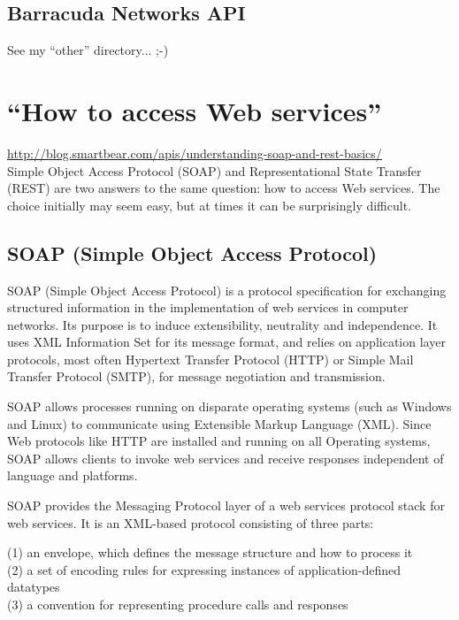 \documentclass[11pt]{article}
\begin{document}
\subsection{Barracuda Networks API}
See my ``other'' directory... ;-)



\newpage
\section{``How to access Web services''}
\href{http://blog.smartbear.com/apis/understanding-soap-and-rest-basics/}{http://blog.smartbear.com/apis/understanding-soap-and-rest-basics/}\\
Simple Object Access Protocol (SOAP) and Representational State Transfer (REST) are two answers to the same question: how to access Web services. The choice initially may seem easy, but at times it can be surprisingly difficult.

\subsection{SOAP (Simple Object Access Protocol)} 
SOAP (Simple Object Access Protocol) is a protocol specification for
exchanging structured information in the implementation of web
services in computer networks. Its purpose is to induce extensibility,
neutrality and independence. It uses XML Information Set for its
message format, and relies on application layer protocols, most often
Hypertext Transfer Protocol (HTTP) or Simple Mail Transfer Protocol
(SMTP), for message negotiation and transmission.

SOAP allows processes running on disparate operating systems (such as
Windows and Linux) to communicate using Extensible Markup Language
(XML). Since Web protocols like HTTP are installed and running on all
Operating systems, SOAP allows clients to invoke web services and
receive responses independent of language and platforms.

SOAP provides the Messaging Protocol layer of a web services protocol stack for web services. It is an XML-based protocol consisting of three parts:

(1) an envelope, which defines the message structure and how to process it\\
(2) a set of encoding rules for expressing instances of application-defined datatypes\\
(3) a convention for representing procedure calls and responses\\
\end{document}
